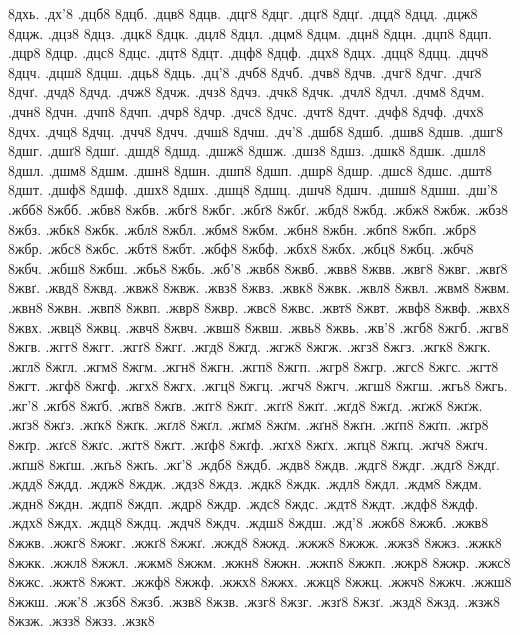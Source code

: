 {8дхь.
.дх'8
.дцб8
8дцб.
.дцв8
8дцв.
.дцг8
8дцг.
.дцґ8
8дцґ.
.дцд8
8дцд.
.дцж8
8дцж.
.дцз8
8дцз.
.дцк8
8дцк.
.дцл8
8дцл.
.дцм8
8дцм.
.дцн8
8дцн.
.дцп8
8дцп.
.дцр8
8дцр.
.дцс8
8дцс.
.дцт8
8дцт.
.дцф8
8дцф.
.дцх8
8дцх.
.дцц8
8дцц.
.дцч8
8дцч.
.дцш8
8дцш.
.дць8
8дць.
.дц'8
.дчб8
8дчб.
.дчв8
8дчв.
.дчг8
8дчг.
.дчґ8
8дчґ.
.дчд8
8дчд.
.дчж8
8дчж.
.дчз8
8дчз.
.дчк8
8дчк.
.дчл8
8дчл.
.дчм8
8дчм.
.дчн8
8дчн.
.дчп8
8дчп.
.дчр8
8дчр.
.дчс8
8дчс.
.дчт8
8дчт.
.дчф8
8дчф.
.дчх8
8дчх.
.дчц8
8дчц.
.дчч8
8дчч.
.дчш8
8дчш.
.дч'8
.дшб8
8дшб.
.дшв8
8дшв.
.дшг8
8дшг.
.дшґ8
8дшґ.
.дшд8
8дшд.
.дшж8
8дшж.
.дшз8
8дшз.
.дшк8
8дшк.
.дшл8
8дшл.
.дшм8
8дшм.
.дшн8
8дшн.
.дшп8
8дшп.
.дшр8
8дшр.
.дшс8
8дшс.
.дшт8
8дшт.
.дшф8
8дшф.
.дшх8
8дшх.
.дшц8
8дшц.
.дшч8
8дшч.
.дшш8
8дшш.
.дш'8
.жбб8
8жбб.
.жбв8
8жбв.
.жбг8
8жбг.
.жбґ8
8жбґ.
.жбд8
8жбд.
.жбж8
8жбж.
.жбз8
8жбз.
.жбк8
8жбк.
.жбл8
8жбл.
.жбм8
8жбм.
.жбн8
8жбн.
.жбп8
8жбп.
.жбр8
8жбр.
.жбс8
8жбс.
.жбт8
8жбт.
.жбф8
8жбф.
.жбх8
8жбх.
.жбц8
8жбц.
.жбч8
8жбч.
.жбш8
8жбш.
.жбь8
8жбь.
.жб'8
.жвб8
8жвб.
.жвв8
8жвв.
.жвг8
8жвг.
.жвґ8
8жвґ.
.жвд8
8жвд.
.жвж8
8жвж.
.жвз8
8жвз.
.жвк8
8жвк.
.жвл8
8жвл.
.жвм8
8жвм.
.жвн8
8жвн.
.жвп8
8жвп.
.жвр8
8жвр.
.жвс8
8жвс.
.жвт8
8жвт.
.жвф8
8жвф.
.жвх8
8жвх.
.жвц8
8жвц.
.жвч8
8жвч.
.жвш8
8жвш.
.жвь8
8жвь.
.жв'8
.жгб8
8жгб.
.жгв8
8жгв.
.жгг8
8жгг.
.жгґ8
8жгґ.
.жгд8
8жгд.
.жгж8
8жгж.
.жгз8
8жгз.
.жгк8
8жгк.
.жгл8
8жгл.
.жгм8
8жгм.
.жгн8
8жгн.
.жгп8
8жгп.
.жгр8
8жгр.
.жгс8
8жгс.
.жгт8
8жгт.
.жгф8
8жгф.
.жгх8
8жгх.
.жгц8
8жгц.
.жгч8
8жгч.
.жгш8
8жгш.
.жгь8
8жгь.
.жг'8
.жґб8
8жґб.
.жґв8
8жґв.
.жґг8
8жґг.
.жґґ8
8жґґ.
.жґд8
8жґд.
.жґж8
8жґж.
.жґз8
8жґз.
.жґк8
8жґк.
.жґл8
8жґл.
.жґм8
8жґм.
.жґн8
8жґн.
.жґп8
8жґп.
.жґр8
8жґр.
.жґс8
8жґс.
.жґт8
8жґт.
.жґф8
8жґф.
.жґх8
8жґх.
.жґц8
8жґц.
.жґч8
8жґч.
.жґш8
8жґш.
.жґь8
8жґь.
.жґ'8
.ждб8
8ждб.
.ждв8
8ждв.
.ждг8
8ждг.
.ждґ8
8ждґ.
.ждд8
8ждд.
.ждж8
8ждж.
.ждз8
8ждз.
.ждк8
8ждк.
.ждл8
8ждл.
.ждм8
8ждм.
.ждн8
8ждн.
.ждп8
8ждп.
.ждр8
8ждр.
.ждс8
8ждс.
.ждт8
8ждт.
.ждф8
8ждф.
.ждх8
8ждх.
.ждц8
8ждц.
.ждч8
8ждч.
.ждш8
8ждш.
.жд'8
.жжб8
8жжб.
.жжв8
8жжв.
.жжг8
8жжг.
.жжґ8
8жжґ.
.жжд8
8жжд.
.жжж8
8жжж.
.жжз8
8жжз.
.жжк8
8жжк.
.жжл8
8жжл.
.жжм8
8жжм.
.жжн8
8жжн.
.жжп8
8жжп.
.жжр8
8жжр.
.жжс8
8жжс.
.жжт8
8жжт.
.жжф8
8жжф.
.жжх8
8жжх.
.жжц8
8жжц.
.жжч8
8жжч.
.жжш8
8жжш.
.жж'8
.жзб8
8жзб.
.жзв8
8жзв.
.жзг8
8жзг.
.жзґ8
8жзґ.
.жзд8
8жзд.
.жзж8
8жзж.
.жзз8
8жзз.
.жзк8
}
